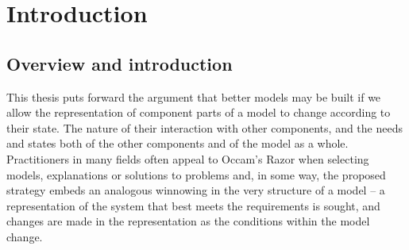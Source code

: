 \titlepg
\signaturepage
\altcopyrightpage
\abswithesis
\ackpage
{}



\chapter[INTRODUCTION]{Introduction}\label{intro}

\section{Overview and introduction}

This thesis puts forward the argument that better models may be built
if we allow the representation of component parts of a model to change
according to their state. The nature of their interaction with other
components, and the needs and states both of the other components and
of the model as a whole. Practitioners in many fields often appeal to
Occam's Razor when selecting models, explanations or solutions to
problems and, in some way, the proposed strategy embeds an analogous
winnowing in the very structure of a model -- a representation of the
system that best meets the requirements is sought, and changes are
made in the representation as the conditions within the model change.

